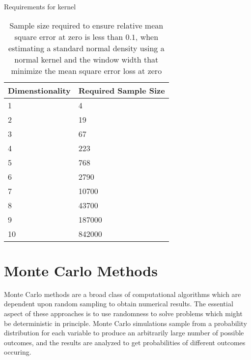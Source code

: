 Requirements for kernel
\begin{table}[htbp]
   \caption{Sample size required to ensure relative mean square error at zero is
       less than $0.1$, when estimating a standard normal density using a normal
       kernel and the window width that minimize the mean square error loss at
       zero\cite{silverman1986_density_estimation}}
   \label{tab:kde_sample_req}
   \begin{tabularx}{6.5in}{XX}
     \hline
     Dimenstionality & Required Sample Size \\
     \hline
     1 & 4 \\
     2 & 19 \\
     3 & 67 \\
     4 & 223 \\
     5 & 768 \\
     6 & 2790 \\
     7 & 10700 \\
     8 & 43700 \\
     9 & 187000 \\
     10 & 842000 \\
     \hline
   \end{tabularx}
\end{table}

\section{Monte Carlo Methods}

Monte Carlo methods are a broad class of computational algorithms which are dependent upon random sampling to obtain numerical results.
The essential aspect of these approaches is to use randomness to solve problems which might be deterministic in principle.
Monte Carlo simulations sample from a probability distribution for each variable to produce an arbitrarily large number of possible outcomes, and  the results are analyzed to get probabilities of different outcomes occuring.

